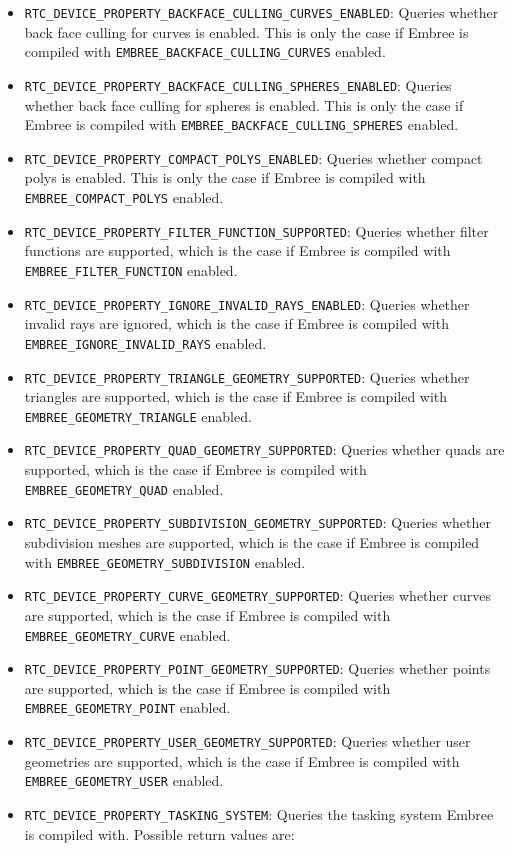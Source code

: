 \begin{itemize}
\item
  \texttt{RTC\_DEVICE\_PROPERTY\_BACKFACE\_CULLING\_CURVES\_ENABLED}:
  Queries whether back face culling for curves is enabled. This is only
  the case if Embree is compiled with
  \texttt{EMBREE\_BACKFACE\_CULLING\_CURVES} enabled.
\item
  \texttt{RTC\_DEVICE\_PROPERTY\_BACKFACE\_CULLING\_SPHERES\_ENABLED}:
  Queries whether back face culling for spheres is enabled. This is only
  the case if Embree is compiled with
  \texttt{EMBREE\_BACKFACE\_CULLING\_SPHERES} enabled.
\item
  \texttt{RTC\_DEVICE\_PROPERTY\_COMPACT\_POLYS\_ENABLED}: Queries
  whether compact polys is enabled. This is only the case if Embree is
  compiled with \texttt{EMBREE\_COMPACT\_POLYS} enabled.
\item
  \texttt{RTC\_DEVICE\_PROPERTY\_FILTER\_FUNCTION\_SUPPORTED}: Queries
  whether filter functions are supported, which is the case if Embree is
  compiled with \texttt{EMBREE\_FILTER\_FUNCTION} enabled.
\item
  \texttt{RTC\_DEVICE\_PROPERTY\_IGNORE\_INVALID\_RAYS\_ENABLED}:
  Queries whether invalid rays are ignored, which is the case if Embree
  is compiled with \texttt{EMBREE\_IGNORE\_INVALID\_RAYS} enabled.
\item
  \texttt{RTC\_DEVICE\_PROPERTY\_TRIANGLE\_GEOMETRY\_SUPPORTED}: Queries
  whether triangles are supported, which is the case if Embree is
  compiled with \texttt{EMBREE\_GEOMETRY\_TRIANGLE} enabled.
\item
  \texttt{RTC\_DEVICE\_PROPERTY\_QUAD\_GEOMETRY\_SUPPORTED}: Queries
  whether quads are supported, which is the case if Embree is compiled
  with \texttt{EMBREE\_GEOMETRY\_QUAD} enabled.
\item
  \texttt{RTC\_DEVICE\_PROPERTY\_SUBDIVISION\_GEOMETRY\_SUPPORTED}:
  Queries whether subdivision meshes are supported, which is the case if
  Embree is compiled with \texttt{EMBREE\_GEOMETRY\_SUBDIVISION}
  enabled.
\item
  \texttt{RTC\_DEVICE\_PROPERTY\_CURVE\_GEOMETRY\_SUPPORTED}: Queries
  whether curves are supported, which is the case if Embree is compiled
  with \texttt{EMBREE\_GEOMETRY\_CURVE} enabled.
\item
  \texttt{RTC\_DEVICE\_PROPERTY\_POINT\_GEOMETRY\_SUPPORTED}: Queries
  whether points are supported, which is the case if Embree is compiled
  with \texttt{EMBREE\_GEOMETRY\_POINT} enabled.
\item
  \texttt{RTC\_DEVICE\_PROPERTY\_USER\_GEOMETRY\_SUPPORTED}: Queries
  whether user geometries are supported, which is the case if Embree is
  compiled with \texttt{EMBREE\_GEOMETRY\_USER} enabled.
\item
  \texttt{RTC\_DEVICE\_PROPERTY\_TASKING\_SYSTEM}: Queries the tasking
  system Embree is compiled with. Possible return values are:


\end{itemize}
